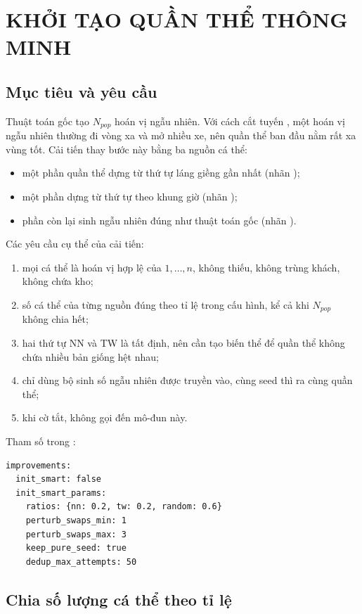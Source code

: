 \chapter{KHỞI TẠO QUẦN THỂ THÔNG MINH}
\label{chap:init}

\section{Mục tiêu và yêu cầu}

Thuật toán gốc tạo $N_{pop}$ hoán vị ngẫu nhiên. Với cách cắt tuyến , một hoán vị
ngẫu nhiên thường đi vòng xa và mở nhiều xe, nên quần thể ban đầu nằm rất xa vùng tốt. Cải tiến
 thay bước này bằng ba nguồn cá thể:
\begin{itemize}
  \item một phần quần thể dựng từ thứ tự láng giềng gần nhất (nhãn );
  \item một phần dựng từ thứ tự theo khung giờ (nhãn );
  \item phần còn lại sinh ngẫu nhiên đúng như thuật toán gốc (nhãn ).
\end{itemize}
Các yêu cầu cụ thể của cải tiến:
\begin{enumerate}
  \item mọi cá thể là hoán vị hợp lệ của $1,\dots,n$, không thiếu, không trùng khách, không chứa kho;
  \item số cá thể của từng nguồn đúng theo tỉ lệ trong cấu hình, kể cả khi $N_{pop}$ không chia hết;
  \item hai thứ tự NN và TW là tất định, nên cần tạo biến thể để quần thể không chứa nhiều bản giống hệt
        nhau;
  \item chỉ dùng bộ sinh số ngẫu nhiên được truyền vào, cùng seed thì ra cùng quần thể;
  \item khi cờ tắt,  không gọi đến mô-đun này.
\end{enumerate}

Tham số trong :
\begin{Verbatim}
improvements:
  init_smart: false
  init_smart_params:
    ratios: {nn: 0.2, tw: 0.2, random: 0.6}
    perturb_swaps_min: 1
    perturb_swaps_max: 3
    keep_pure_seed: true
    dedup_max_attempts: 50
\end{Verbatim}

\section{Chia số lượng cá thể theo tỉ lệ}
\label{sec:quota}

